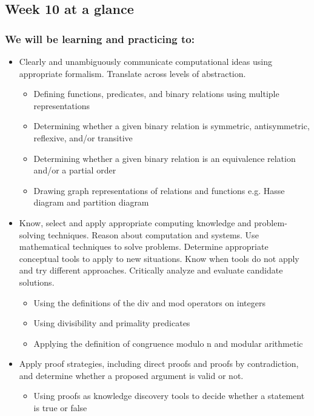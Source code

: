 

\subsection*{Week 10 at a glance}

\subsubsection*{We will be learning and practicing to:}
\begin{itemize}

\item Clearly and unambiguously communicate computational ideas using appropriate formalism. Translate across levels of abstraction.
\begin{itemize}
    \item Defining functions, predicates, and binary relations using multiple representations
    \item Determining whether a given binary relation is symmetric, antisymmetric, reflexive, and/or transitive
    \item Determining whether a given binary relation is an equivalence relation and/or a partial order
    \item Drawing graph representations of relations and functions e.g. Hasse diagram and partition diagram
\end{itemize}

\item Know, select and apply appropriate computing knowledge and problem-solving techniques. Reason about computation and systems. Use mathematical techniques to solve problems. Determine appropriate conceptual tools to apply to new situations. Know when tools do not apply and try different approaches. Critically analyze and evaluate candidate solutions.
\begin{itemize}
    \item Using the definitions of the div and mod operators on integers
    \item Using divisibility and primality predicates
    \item Applying the definition of congruence modulo n and modular arithmetic
\end{itemize}

\item Apply proof strategies, including direct proofs and proofs by contradiction, and determine whether a proposed argument is valid or not.
\begin{itemize}
    \item Using proofs as knowledge discovery tools to decide whether a statement is true or false
\end{itemize}
\end{itemize}

